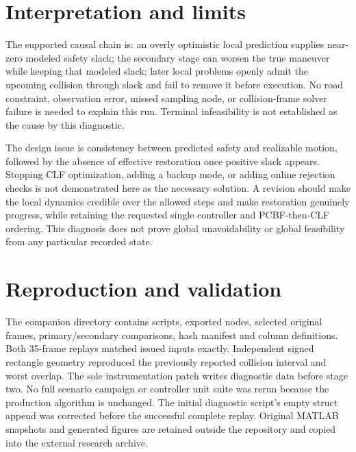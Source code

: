 \documentclass[11pt]{article}
\begin{document}
\section{Interpretation and limits}
The supported causal chain is: an overly optimistic local prediction supplies
near-zero modeled safety slack; the secondary stage can worsen the true
maneuver while keeping that modeled slack; later local problems openly admit
the upcoming collision through slack and fail to remove it before execution.
No road constraint, observation error, missed sampling node, or collision-frame
solver failure is needed to explain this run. Terminal infeasibility is not
established as the cause by this diagnostic.

The design issue is consistency between predicted safety and realizable
motion, followed by the absence of effective restoration once positive slack
appears. Stopping CLF optimization, adding a backup mode, or adding online
rejection checks is not demonstrated here as the necessary solution. A
revision should make the local dynamics credible over the allowed steps and
make restoration genuinely progress, while retaining the requested single
controller and PCBF-then-CLF ordering. This diagnosis does not prove global
unavoidability or global feasibility from any particular recorded state.

\section{Reproduction and validation}
The companion directory 
contains scripts, exported nodes, selected original frames, primary/secondary
comparisons, hash manifest and column definitions. Both 35-frame replays
matched issued inputs exactly. Independent signed rectangle geometry
reproduced the previously reported collision interval and worst overlap.
The sole instrumentation patch writes diagnostic data before stage two.
No full scenario campaign or controller unit suite was rerun because the
production algorithm is unchanged. The initial diagnostic script's empty
struct append was corrected before the successful complete replay.
Original MATLAB snapshots and generated figures are retained outside the
repository and copied into the external research archive.
\end{document}
